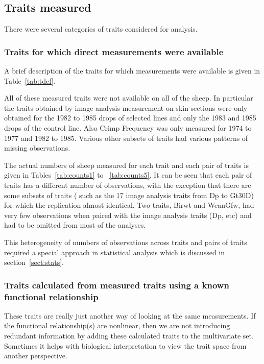 \documentclass[titlepage]{article}  %
\begin{document}
\subsection{Traits measured}
There were several categories of traits considered for analysis. 

\subsubsection{Traits for which direct measurements were available}
A brief description of the traits for which measurements were available is given in Table~\ref{tab:tdef}.



All of these measured traits were not available on all of the sheep. In particular the traits obtained by image analysis measurement on skin sections were only obtained for the 1982 to 1985 drops of selected lines and only the 1983 and 1985 drops of the control line. Also Crimp Frequency was only measured for 1974 to 1977 and 1982 to 1985. Various other subsets of traits had various patterns of missing observations. 

The actual numbers of sheep measured for each trait and each pair of traits is given in Tables~\ref{tab:counts1} to ~\ref{tab:counts5}. It can be seen that each pair of traits has a different number of observations, with the exception that there are some subsets of traits ( such as the 17 image analysis traits from Dp to Gt30D) for which the replication almost identical. Two traits, Birwt and WeanGfw, had very few observations when paired with the image analysis traits (Dp, etc) and had to be omitted from most of the analyses.







This heterogeneity of numbers of observations across traits and pairs of traits required a special approach in statistical analysis which is discussed in section~\ref{sect:stats}.

\subsubsection{Traits calculated from measured traits using a known functional relationship}
These traits are really just another way of looking at the same measurements. If the functional relationship(s) are nonlinear, then we are not introducing redundant information by adding these calculated traits to the multivariate set. Sometimes it helps with biological interpretation to view the trait space from another perspective.
\end{document}
